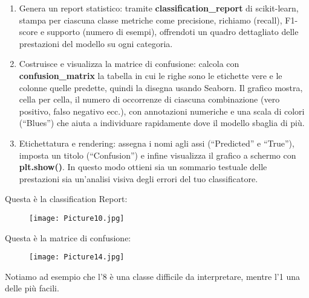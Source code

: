 \documentclass[a4paper,12pt]{article}
\begin{document}
\begin{enumerate}
    \item Genera un report statistico: tramite \textbf{classification\_report} di scikit-learn, stampa per ciascuna classe metriche come precisione, richiamo (recall), F1-score e supporto (numero di esempi), offrendoti un quadro dettagliato delle prestazioni del modello su ogni categoria.
    \item Costruisce e visualizza la matrice di confusione: calcola con \textbf{confusion\_matrix} la tabella in cui le righe sono le etichette vere e le colonne quelle predette, quindi la disegna usando Seaborn. Il grafico mostra, cella per cella, il numero di occorrenze di ciascuna combinazione (vero positivo, falso negativo ecc.), con annotazioni numeriche e una scala di colori (“Blues”) che aiuta a individuare rapidamente dove il modello sbaglia di più.
    \item Etichettatura e rendering: assegna i nomi agli assi (“Predicted” e “True”), imposta un titolo (“Confusion”) e infine visualizza il grafico a schermo con \textbf{plt.show()}. In questo modo ottieni sia un sommario testuale delle prestazioni sia un’analisi visiva degli errori del tuo classificatore.
\end{enumerate}
\begin{center}
    Questa è la classification Report:
\end{center}
\begin{figure}[H]
    \centering
    \texttt{[image: Picture10.jpg]}
    \label{etichetta35}
\end{figure}
\begin{center}
    Questa è la matrice di confusione:
\end{center}
\begin{figure}[H]
    \centering
    \texttt{[image: Picture14.jpg]}
    \label{etichetta36}
\end{figure}
\noindent Notiamo ad esempio che l'8 è una classe difficile da interpretare, mentre l'1 una delle più facili.
\end{document}
